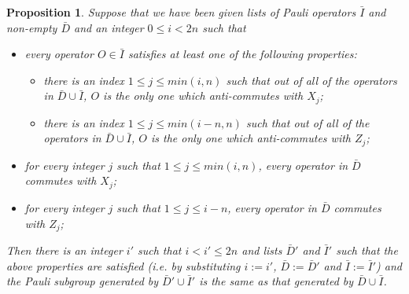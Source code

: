 \documentclass[twocolumn,showpacs,preprintnumbers,amsmath,amssymb,nofootinbib,pra,floatfix]{revtex4}
\newtheorem{proposition}{Proposition}
\begin{document}
\begin{proposition}
\label{make-independent-using-split}
Suppose that we have been given lists of Pauli operators $\bar I$ and non-empty $\bar D$ and an integer $0 \leq i < 2n$ such that
\begin{itemize}
\label{each-is-independent}
\item every operator $O\in \bar I$ satisfies at least one of the following properties:
  \begin{itemize}
  \item there is an index $1\le j\le min(i,n)$ such that out of all of the operators in $\bar D\cup \bar I$, $O$ is the only one which anti-commutes with $X_j$;
  \item there is an index $1\le j\le min(i-n,n)$ such that out of all of the operators in $\bar D\cup \bar I$, $O$ is the only one which anti-commutes with $Z_j$;
  \end{itemize}
\item\label{no-Z-in-D} for every integer $j$ such that $1 \le j \le min(i,n)$, every operator in $\bar D$ commutes with $X_j$;
\item\label{no-X-in-D}  for every integer $j$ such that $1 \le j \le i-n$, every operator in $\bar D$ commutes with $Z_j$;
\end{itemize}
Then there is an integer $i'$ such that $i< i' \le 2n$ and lists $\bar D'$ and $\bar I'$ such that the above properties are satisfied (i.e. by substituting $i:=i'$, $\bar D:=\bar D'$ and $\bar I:=\bar I'$) and the Pauli subgroup generated by $\bar D'\cup \bar I'$ is the same as that generated by $\bar D\cup \bar I$.
\end{proposition}
\end{document}
